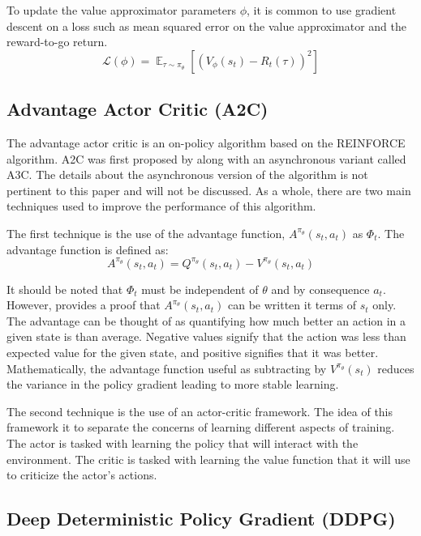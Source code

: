 \documentclass[conference]{IEEEtran}
\begin{document}
To update the value approximator parameters $\phi$, it is common to use gradient descent on a loss such as mean squared error on the value approximator and the reward-to-go return.
$$
    \mathcal{L}(\phi) = \mathop{\mathbb{E}}_{\tau \sim \pi_\theta} \left[\left(V_\phi(s_t) - R_t(\tau)\right)^2\right]
$$

\subsection{Advantage Actor Critic (A2C)}

The advantage actor critic is an on-policy algorithm based on the REINFORCE algorithm. A2C was first proposed by \cite{A2C} along with an asynchronous variant called A3C. The details about the asynchronous version of the algorithm is not pertinent to this paper and will not be discussed. As a whole, there are two main techniques used to improve the performance of this algorithm.

The first technique is the use of the advantage function, $A^{\pi_\theta}(s_t, a_t)$ as $\Phi_t$. The advantage function is defined as:
$$
    A^{\pi_\theta}(s_t, a_t) = Q^{\pi_\theta}(s_t, a_t) - V^{\pi_\theta}(s_t, a_t)
$$

It should be noted that $\Phi_t$ must be independent of $\theta$ and by consequence $a_t$. However, \cite{spinning_up_policy_optimization} provides a proof that $A^{\pi_\theta}(s_t, a_t)$ can be written it terms of $s_t$ only. The advantage can be thought of as quantifying how much better an action in a given state is than average. Negative values signify that the action was less than expected value for the given state, and positive signifies that it was better. Mathematically, the advantage function useful as subtracting by $V^{\pi_\theta}(s_t)$ reduces the variance in the policy gradient leading to more stable learning.

The second technique is the use of an actor-critic framework. The idea of this framework it to separate the concerns of learning different aspects of training. The actor is tasked with learning the policy that will interact with the environment. The critic is tasked with learning the value function that it will use to criticize the actor's actions. \cite{deepmind_slides_9}

\subsection{Deep Deterministic Policy Gradient (DDPG)}
\end{document}
